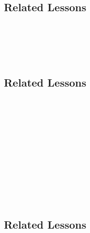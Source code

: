 \subsection{Related Lessons}
\fourFKTwelve{}\\
\fourFKFourteen{}\\
\fourFKFifteen{}\\
\fourFKSixteen{}\\
\subsection{Related Lessons}
\fourFKTen{}\\
\fourFKThirteen{}\\
\fourFKFifteen{}\\
\fourFKSixteen{}\\
\fourFKSeventeen{}\\
\fourFKTwentyFour{}\\
\fourFKTwentySix{}\\
\fourFKThirtyFive{}\\
%
\fourFKFifteen{}\\
\fourFKThirtyOne{}\\
\fourFKThirtyThree{}\\
\subsection{Related Lessons}
\fourgTwo{}\\
\fourgFive{}\\
\fourFKSeven{}\\
\fourFKThirteen{}\\
\fourFKFourteen{}\\
\fourFKFifteen{}\\
